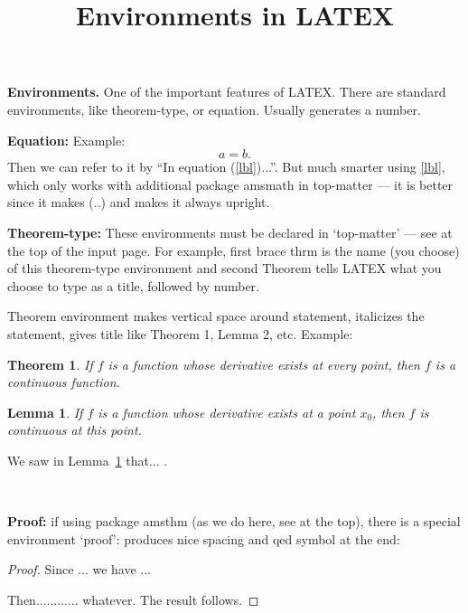 \documentclass{article}
\newtheorem{thrm}{Theorem} %
\newtheorem{lemma}{Lemma}
\begin{document}
\title{Environments in LATEX}
\date{}
\maketitle


\textbf{Environments.} One of the important features of LATEX.
There are standard environments, like theorem-type, or  equation.
Usually generates a number.

\textbf{Equation:} Example:
\begin{equation} \label{lbl}
a=b .
\end{equation}
Then we can refer to it by ``In equation (\ref{lbl})...''. But much smarter using \eqref{lbl}, which only works  with additional package amsmath in top-matter ---  it is  better since it makes (..)  and makes it always upright.

\textbf{Theorem-type:} These environments must be declared in `top-matter' --- see at the top of the input page. For example, first brace thrm is the name (you choose) of this theorem-type environment and second Theorem tells LATEX what you choose to type as a title, followed by number.

Theorem environment makes vertical space around statement, italicizes the statement, gives title like Theorem 1, Lemma 2, etc. Example:

\begin{thrm}\label{th1}
If $f$ is a function whose derivative exists at every point, then $f$
is a continuous function.
\end{thrm}

\begin{lemma}\label{l1}
If $f$ is a function whose derivative exists at a point $x_0$, then $f$
is continuous at this point.
\end{lemma}

We saw in Lemma~\ref{l1} that... .

\

\textbf{Proof:} if using package amsthm (as we do here, see at the top), there is a special environment `proof':
 produces nice spacing and qed symbol at the end:

\begin{proof}
Since ... we have ...

Then............ whatever. The result follows.
\end{proof}
\end{document}
